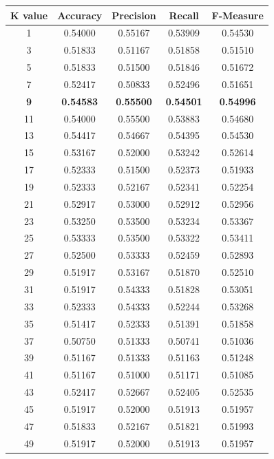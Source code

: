 \documentclass{article}
\begin{document}
\begin{center}
\begin{tabular}{ |c|c|c|c|c| } 
  \hline
  \textbf{K value} & \textbf{Accuracy} & \textbf{Precision} & \textbf{Recall} & \textbf{F-Measure}\\ 
  \hline
  1 &  0.54000 &  0.55167 &  0.53909 &  0.54530 \\
    3 &  0.51833 &  0.51167 &  0.51858 &  0.51510 \\
    5 &  0.51833 &  0.51500 &  0.51846 &  0.51672 \\
    7 &  0.52417 &  0.50833 &  0.52496 &  0.51651 \\
    \textbf{9} &  \textbf{0.54583} &  \textbf{0.55500} &  \textbf{0.54501} &  \textbf{0.54996} \\
    11 &  0.54000 &  0.55500 &  0.53883 &  0.54680 \\
    13 &  0.54417 &  0.54667 &  0.54395 &  0.54530 \\
    15 &  0.53167 &  0.52000 &  0.53242 &  0.52614 \\
    17 &  0.52333 &  0.51500 &  0.52373 &  0.51933 \\
    19 &  0.52333 &  0.52167 &  0.52341 &  0.52254 \\
    21 &  0.52917 &  0.53000 &  0.52912 &  0.52956 \\
    23 &  0.53250 &  0.53500 &  0.53234 &  0.53367 \\
    25 &  0.53333 &  0.53500 &  0.53322 &  0.53411 \\
    27 &  0.52500 &  0.53333 &  0.52459 &  0.52893 \\
    29 &  0.51917 &  0.53167 &  0.51870 &  0.52510 \\
    31 &  0.51917 &  0.54333 &  0.51828 &  0.53051 \\
    33 &  0.52333 &  0.54333 &  0.52244 &  0.53268 \\
    35 &  0.51417 &  0.52333 &  0.51391 &  0.51858 \\
    37 &  0.50750 &  0.51333 &  0.50741 &  0.51036 \\
    39 &  0.51167 &  0.51333 &  0.51163 &  0.51248 \\
    41 &  0.51167 &  0.51000 &  0.51171 &  0.51085 \\
    43 &  0.52417 &  0.52667 &  0.52405 &  0.52535 \\
    45 &  0.51917 &  0.52000 &  0.51913 &  0.51957 \\
    47 &  0.51833 &  0.52167 &  0.51821 &  0.51993 \\
    49 &  0.51917 &  0.52000 &  0.51913 &  0.51957 \\

\end{tabular}
\end{center}
\end{document}
